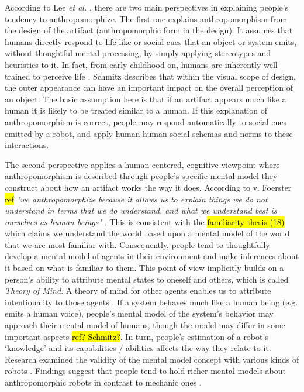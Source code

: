 \documentclass[twocolumn]{svjour3}          %
\begin{document}
	According to Lee \textit{et al.} \cite{lee_human_2005}, there are two main perspectives in explaining people's tendency to anthropomorphize. The first one explains anthropomorphism from the design of the artifact (anthropomorphic form in the design). It assumes that humans directly respond to life-like or social cues that an object or system emits, without thoughtful mental processing, by simply applying stereotypes and heuristics to it. In fact, from early childhood on, humans are inherently well-trained to perceive life \cite{epley_seeing_2007}. Schmitz \cite{schmitz_concepts_2011} describes that within the visual scope of design, the outer appearance can have an important impact on the overall perception of an object. The basic assumption here is that if an artifact appears much like a human it is likely to be treated similar to a human. If this explanation of anthropomorphism is correct, people may respond automatically to social cues emitted by a robot, and apply human-human social schemas and norms to these interactions.
	
	The second perspective applies a human-centered, cognitive viewpoint where anthropomorphism is described through people's specific mental model they construct about how an artifact works the way it does. According to v. Foerster \hl{ref} \textit{"we anthropomorphize because it allows us to explain things we do not understand in terms that we do understand, and what we understand best is ourselves as human beings"} \cite{hegel_understanding_2008}. This is consistent with the \hl{familiarity thesis (18)} \cite{hegel_understanding_2008} which claims we understand the world based upon a mental model of the world that we are most familiar with. Consequently, people tend to thoughtfully develop a mental model of agents in their environment and make inferences about it based on what is familiar to them. This point of view implicitly builds on a person's ability to attribute mental states to oneself and others, which is called \textit{Theory of Mind}. A theory of  mind for other agents enables us to attribute intentionality to those agents \cite{leslie_pretense_1987,admoni_multi-category_2012}. If a system behaves much like a human being (e.g. emits a human voice), people's mental model of the system's behavior may approach their mental model of humans, though the model may differ in some important aspects \hl{ref? Schmitz?}. In turn, people's estimation of a robot's `knowledge' and its capabilities / abilities affects the way they relate to it. Research examined the validity of the mental model concept with various kinds of robots \cite{schmitz_concepts_2011,kiesler_mental_2002}. Findings suggest that people tend to hold richer mental models about anthropomorphic robots in contrast to mechanic ones \cite{kiesler_mental_2002}.
  
\end{document}
